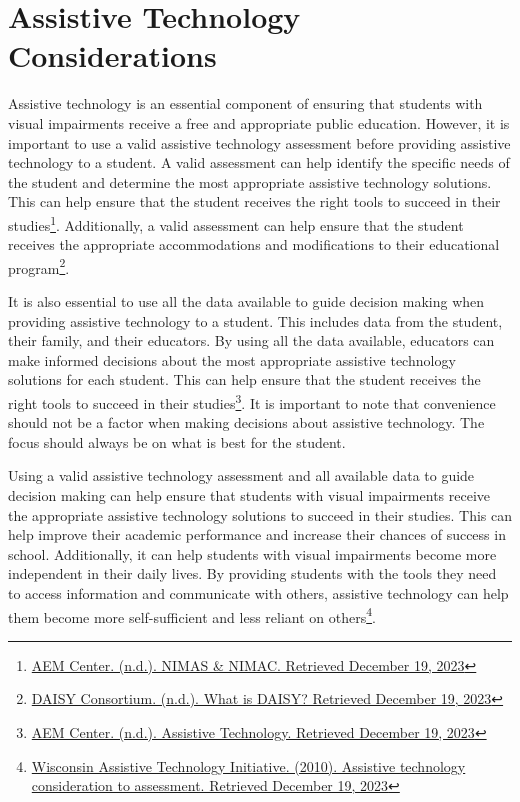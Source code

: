 \chapter{Assistive Technology Considerations}\label{trouble3}
Assistive technology is an essential component of ensuring that students with visual impairments receive a free and appropriate public education. However, it is important to use a valid assistive technology assessment before providing assistive technology to a student. A valid assessment can help identify the specific needs of the student and determine the most appropriate assistive technology solutions. This can help ensure that the student receives the right tools to succeed in their studies\footnote{\raggedright \href{https://aem.cast.org/nimas-nimac/nimas-nimac}{AEM Center. (n.d.). NIMAS \& NIMAC. Retrieved December 19, 2023}}. Additionally, a valid assessment can help ensure that the student receives the appropriate accommodations and modifications to their educational program\footnote{\raggedright \href{https://daisy.org/about\_us/what-is-daisy/ }{DAISY Consortium. (n.d.). What is DAISY? Retrieved December 19, 2023}}.

It is also essential to use all the data available to guide decision making when providing assistive technology to a student. This includes data from the student, their family, and their educators. By using all the data available, educators can make informed decisions about the most appropriate assistive technology solutions for each student. This can help ensure that the student receives the right tools to succeed in their studies\footnote{\raggedright \href{https://aem.cast.org/learn/assistive-technology}{AEM Center. (n.d.). Assistive Technology. Retrieved December 19, 2023}}. It is important to note that convenience should not be a factor when making decisions about assistive technology. The focus should always be on what is best for the student.

Using a valid assistive technology assessment and all available data to guide decision making can help ensure that students with visual impairments receive the appropriate assistive technology solutions to succeed in their studies. This can help improve their academic performance and increase their chances of success in school. Additionally, it can help students with visual impairments become more independent in their daily lives. By providing students with the tools they need to access information and communicate with others, assistive technology can help them become more self-sufficient and less reliant on others\footnote{\raggedright \href{https://www.wati.org/free-publications/assistive-technology-consideration-to-assessment/}{Wisconsin Assistive Technology Initiative. (2010). Assistive technology consideration to assessment. Retrieved December 19, 2023}}.

